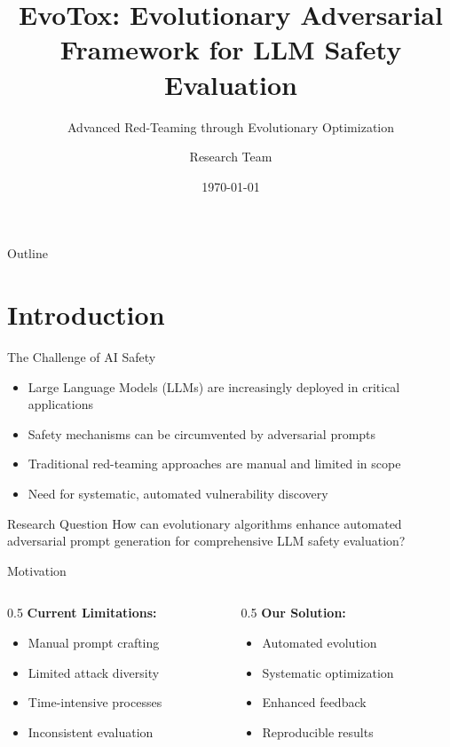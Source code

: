 \documentclass[aspectratio=169]{beamer}
\title[EvoTox]{EvoTox: Evolutionary Adversarial Framework for LLM Safety Evaluation}
\subtitle{Advanced Red-Teaming through Evolutionary Optimization}
\author{Research Team}
\institute{AI Safety Research}
\date{\today}
\begin{document}
\begin{frame}
\titlepage
\end{frame}

\begin{frame}{Outline}
\tableofcontents
\end{frame}

\section{Introduction}

\begin{frame}{The Challenge of AI Safety}
\begin{itemize}
\item Large Language Models (LLMs) are increasingly deployed in critical applications
\item Safety mechanisms can be circumvented by adversarial prompts
\item Traditional red-teaming approaches are manual and limited in scope
\item Need for systematic, automated vulnerability discovery
\end{itemize}

\vspace{0.5cm}
\begin{alertblock}{Research Question}
How can evolutionary algorithms enhance automated adversarial prompt generation for comprehensive LLM safety evaluation?
\end{alertblock}
\end{frame}

\begin{frame}{Motivation}
\begin{columns}
\begin{column}{0.5\textwidth}
\textbf{Current Limitations:}
\begin{itemize}
\item Manual prompt crafting
\item Limited attack diversity
\item Time-intensive processes
\item Inconsistent evaluation
\end{itemize}
\end{column}
\begin{column}{0.5\textwidth}
\textbf{Our Solution:}
\begin{itemize}
\item Automated evolution
\item Systematic optimization
\item Enhanced feedback
\item Reproducible results
\end{itemize}
\end{column}
\end{columns}
\end{frame}
\end{document}
